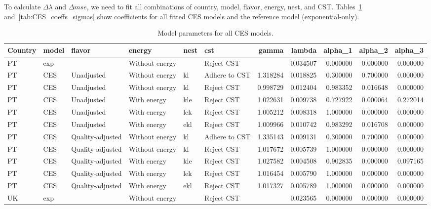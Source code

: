 \documentclass[preprint,authoryear,12pt]{elsarticle}\usepackage[]{graphicx}\usepackage[]{color}
\begin{document}
To calculate $\Delta \lambda$ and $\Delta mse$, we need to fit all combinations of 
country, model, flavor, energy, nest, and CST.
Tables~\ref{tab:CES_coeffs} and~\ref{tab:CES_coeffs_sigmas} show 
coefficients for all fitted CES models and the reference model (exponential-only).
%
\begin{table}[ht]
\centering
\caption{Model parameters for all CES models.} 
\label{tab:CES_coeffs}
{\tiny
\begin{tabular}{llllllrrrrr}
  \hline
Country & model & flavor & energy & nest & cst & gamma & lambda & alpha\_1 & alpha\_2 & alpha\_3 \\ 
  \hline
PT & exp &  & Without energy &  & Reject CST &  & 0.034507 & 0.000000 & 0.000000 & 0.000000 \\ 
  PT & CES & Unadjusted & Without energy & kl & Adhere to CST & 1.318284 & 0.018825 & 0.300000 & 0.700000 & 0.000000 \\ 
  PT & CES & Unadjusted & Without energy & kl & Reject CST & 0.998729 & 0.012404 & 0.983352 & 0.016648 & 0.000000 \\ 
  PT & CES & Unadjusted & With energy & kle & Reject CST & 1.022631 & 0.009738 & 0.727922 & 0.000064 & 0.272014 \\ 
  PT & CES & Unadjusted & With energy & lek & Reject CST & 1.005212 & 0.008318 & 1.000000 & 0.000000 & 0.000000 \\ 
  PT & CES & Unadjusted & With energy & ekl & Reject CST & 1.009966 & 0.010742 & 0.983292 & 0.016708 & 0.000000 \\ 
  PT & CES & Quality-adjusted & Without energy & kl & Adhere to CST & 1.335143 & 0.009131 & 0.300000 & 0.700000 & 0.000000 \\ 
  PT & CES & Quality-adjusted & Without energy & kl & Reject CST & 1.017672 & 0.005739 & 1.000000 & 0.000000 & 0.000000 \\ 
  PT & CES & Quality-adjusted & With energy & kle & Reject CST & 1.027582 & 0.004508 & 0.902835 & 0.000000 & 0.097165 \\ 
  PT & CES & Quality-adjusted & With energy & lek & Reject CST & 1.016454 & 0.005790 & 1.000000 & 0.000000 & 0.000000 \\ 
  PT & CES & Quality-adjusted & With energy & ekl & Reject CST & 1.017327 & 0.005789 & 1.000000 & 0.000000 & 0.000000 \\ 
  UK & exp &  & Without energy &  & Reject CST &  & 0.023565 & 0.000000 & 0.000000 & 0.000000 \\ 

\end{tabular}}
\end{table}
\end{document}
